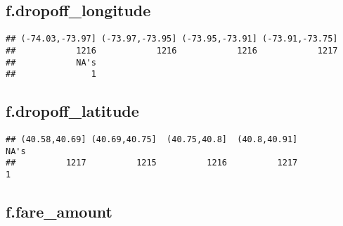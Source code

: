 \documentclass[]{article}
\newenvironment{Shaded}{\begin{snugshade}}{\end{snugshade}}
\newcommand{\KeywordTok}[1]{\textcolor[rgb]{0.13,0.29,0.53}{\textbf{{#1}}}}
\newcommand{\NormalTok}[1]{{#1}}
\begin{document}
\subsection{f.dropoff\_longitude}\label{f.dropoff_longitude}

\begin{Shaded}
\end{Shaded}

\begin{verbatim}
## (-74.03,-73.97] (-73.97,-73.95] (-73.95,-73.91] (-73.91,-73.75] 
##            1216            1216            1216            1217 
##            NA's 
##               1
\end{verbatim}

\subsection{f.dropoff\_latitude}\label{f.dropoff_latitude}

\begin{Shaded}
\end{Shaded}

\begin{verbatim}
## (40.58,40.69] (40.69,40.75]  (40.75,40.8]  (40.8,40.91]          NA's 
##          1217          1215          1216          1217             1
\end{verbatim}

\subsection{f.fare\_amount}\label{f.fare_amount}

\begin{Shaded}
\end{Shaded}
\end{document}
